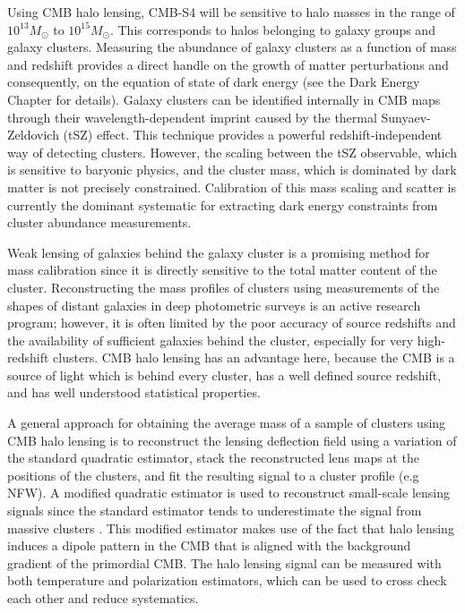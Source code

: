Using CMB halo lensing, CMB-S4 will be sensitive to halo masses in the range of $10^{13} M_{\odot}$ to $10^{15} M_{\odot}$.  This corresponds to halos belonging to galaxy groups and galaxy clusters.  Measuring the abundance of galaxy clusters as a function of mass and redshift provides a direct handle on the growth of matter perturbations and consequently, on the equation of state of dark energy (see the Dark Energy Chapter for details).  Galaxy clusters can be identified internally in CMB maps through their wavelength-dependent imprint caused by the thermal Sunyaev-Zeldovich (tSZ) effect.  This technique provides a powerful redshift-independent way of detecting clusters. However, the scaling between the tSZ observable, which is sensitive to baryonic physics, and the cluster mass, which is dominated by dark matter is not precisely constrained.  Calibration of this mass scaling and scatter is currently the dominant systematic for extracting dark energy constraints from cluster abundance measurements. 

Weak lensing of galaxies behind the galaxy cluster is a promising method for mass calibration since it is directly sensitive to the total matter content of the cluster.  Reconstructing the mass profiles of clusters using measurements of the shapes of distant galaxies in deep photometric surveys is an active research program; however, it is often limited by the poor accuracy of source redshifts and the availability of sufficient galaxies behind the cluster, especially for very high-redshift clusters. CMB halo lensing has an advantage here, because the CMB is a source of light which is behind every cluster, has a well defined source redshift, and has well understood statistical properties.  

A general approach for obtaining the average mass of a sample of clusters using CMB halo lensing is to reconstruct the lensing deflection field using a variation of the standard quadratic estimator, stack the reconstructed lens maps at the positions of the clusters, and fit the resulting signal to a cluster profile (e.g NFW). A modified quadratic estimator is used to reconstruct small-scale lensing signals since the standard estimator tends to underestimate the signal from massive clusters \cite{Hu:2007bt}.  This modified estimator makes use of the fact that halo lensing induces a dipole pattern in the CMB that is aligned with the background gradient of the primordial CMB.  The halo lensing signal can be measured with both temperature and polarization estimators, which can be used to cross check each other and reduce systematics. 

